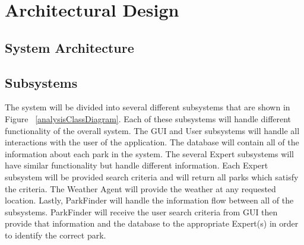 \documentclass[titlepage,12pt]{article}
\begin{document}

\section{Architectural Design}
\label{sec:architectural_design}


\subsection{System Architecture}
\label{sub:system_architecture}



\subsection{Subsystems}
\label{sub:subsystems}

The system will be divided into several different subsystems that are shown in Figure~
\ref{analysisClassDiagram}. Each of these subsystems will handle different functionality of the
overall system. The GUI and User subsystems will handle all interactions with the user of the
application. The database will contain all of the information about each park in the system. The
several Expert subsystems will have similar functionality but handle different information. Each
Expert subsystem will be provided search criteria and will return all parks which satisfy the
criteria. The Weather Agent will provide the weather at any requested location. Lastly, ParkFinder
will handle the information flow between all of the subsystems. ParkFinder will receive the user
search criteria from GUI then provide that information and the database to the appropriate Expert(s)
in order to identify the correct park.
\end{document}
